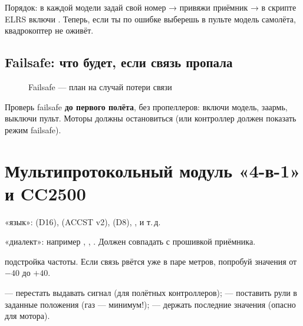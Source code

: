 Порядок: в каждой модели задай свой номер  → привяжи приёмник → в скрипте
ELRS включи . Теперь, если ты по ошибке выберешь в пульте модель
самолёта, квадрокоптер не оживёт.

\subsection{Failsafe: что будет, если связь пропала}

\begin{figure}[H]
\centering
{}
\caption{Failsafe --- план на случай потери связи}
\end{figure}

\begin{caution}
Проверь failsafe \textbf{до первого полёта}, без пропеллеров: включи модель, заармь, выключи
пульт. Моторы должны остановиться (или контроллер должен показать режим failsafe).
\end{caution}

\section{Мультипротокольный модуль «4-в-1» и CC2500}

\begin{center}
\end{center}

\begin{description}[font=\sffamily\bfseries\color{etx}]
  \item[Protocol] «язык»:  (D16),  (ACCST v2),  (D8),
        ,  и т.\,д.
  \item[Subtype] «диалект»: например , , . Должен
        совпадать с прошивкой приёмника.
  \item[RF Freq. fine tune] подстройка частоты. Если связь рвётся уже в паре метров,
        попробуй значения от $-40$ до $+40$.
  \item[Failsafe]  --- перестать выдавать сигнал (для полётных контроллеров);
         --- поставить рули в заданные положения (газ --- минимум!);
         --- держать последние значения (опасно для мотора).
\end{description}

